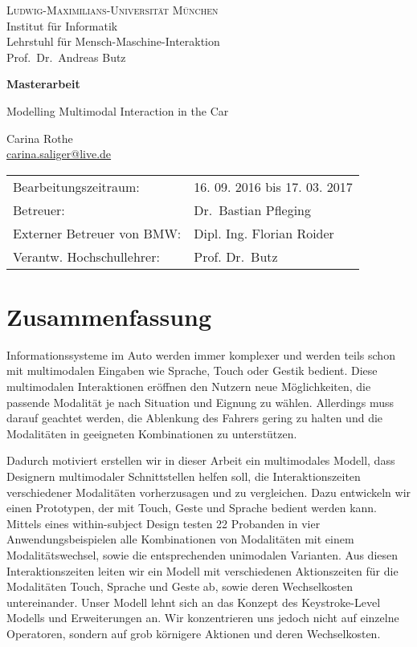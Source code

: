 \documentclass[11pt,a4paper,twoside]{book}
\begin{document}
\pagestyle{empty} %

\begin{center}
\textsc{Ludwig-Maximilians-Universität München}\\
Institut für Informatik\\
Lehrstuhl für Mensch-Maschine-Interaktion\\
Prof.\ Dr.\ Andreas Butz

\vspace{5cm}
{\large\textbf{Masterarbeit}}\vspace{.5cm}

{\LARGE Modelling Multimodal Interaction in the Car}\vspace{1cm}

{\large Carina Rothe}\\\href{carina.saliger@live.de}{carina.saliger@live.de}

\end{center}
\vfill

\begin{tabular}{ll}
Bearbeitungszeitraum: & 16. 09. 2016 bis 17. 03. 2017\\
Betreuer: & Dr.\ Bastian Pfleging \\
Externer Betreuer von BMW: & Dipl. Ing. Florian Roider\\
Verantw. Hochschullehrer: & Prof. Dr.\ Butz 
\end{tabular}
\cleardoublepage
\chapter*{Zusammenfassung}
Informationssysteme im Auto werden immer komplexer und werden teils schon mit multimodalen Eingaben wie Sprache, Touch oder Gestik bedient.
Diese multimodalen Interaktionen eröffnen den Nutzern neue Möglichkeiten, die passende Modalität je nach Situation und Eignung zu wählen.
Allerdings muss darauf geachtet werden, die Ablenkung des Fahrers gering zu halten und die Modalitäten in geeigneten Kombinationen zu unterstützen.

Dadurch motiviert erstellen wir in dieser Arbeit ein multimodales Modell, dass Designern multimodaler Schnittstellen helfen soll, die Interaktionszeiten verschiedener Modalitäten vorherzusagen und zu vergleichen.
Dazu entwickeln wir einen Prototypen, der mit Touch, Geste und Sprache bedient werden kann.
Mittels eines within-subject Design testen 22 Probanden in vier Anwendungsbeispielen alle Kombinationen von Modalitäten mit einem Modalitätswechsel, sowie die entsprechenden unimodalen Varianten.
Aus diesen Interaktionszeiten leiten wir ein Modell mit verschiedenen Aktionszeiten für die Modalitäten Touch, Sprache und Geste ab, sowie deren Wechselkosten untereinander.
Unser Modell lehnt sich an das Konzept des Keystroke-Level Modells und Erweiterungen an.
Wir konzentrieren uns jedoch nicht auf einzelne Operatoren, sondern auf grob körnigere Aktionen und deren Wechselkosten.
\end{document}
